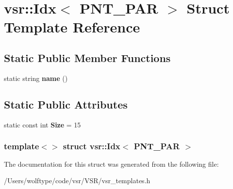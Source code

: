 \hypertarget{structvsr_1_1_idx_3_01_p_n_t___p_a_r_01_4}{\section{vsr\-:\-:Idx$<$ P\-N\-T\-\_\-\-P\-A\-R $>$ Struct Template Reference}
\label{structvsr_1_1_idx_3_01_p_n_t___p_a_r_01_4}
}
\subsection*{Static Public Member Functions}
\begin{DoxyCompactItemize}
\item 
\hypertarget{structvsr_1_1_idx_3_01_p_n_t___p_a_r_01_4_a3bc80b5bd521c9b21417df58a71ec91a}{static string {\bfseries name} ()}\label{structvsr_1_1_idx_3_01_p_n_t___p_a_r_01_4_a3bc80b5bd521c9b21417df58a71ec91a}

\end{DoxyCompactItemize}
\subsection*{Static Public Attributes}
\begin{DoxyCompactItemize}
\item 
\hypertarget{structvsr_1_1_idx_3_01_p_n_t___p_a_r_01_4_a2fe7556235d0681598427116ba340c5b}{static const int {\bfseries Size} = 15}\label{structvsr_1_1_idx_3_01_p_n_t___p_a_r_01_4_a2fe7556235d0681598427116ba340c5b}

\end{DoxyCompactItemize}
\subsubsection*{template$<$$>$ struct vsr\-::\-Idx$<$ P\-N\-T\-\_\-\-P\-A\-R $>$}



The documentation for this struct was generated from the following file\-:\begin{DoxyCompactItemize}
\item 
/\-Users/wolftype/code/vsr/\-V\-S\-R/vsr\-\_\-templates.\-h\end{DoxyCompactItemize}
